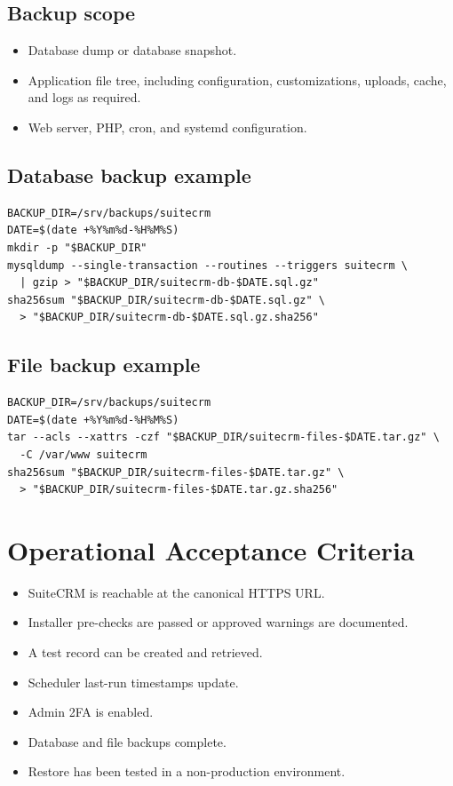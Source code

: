 \documentclass[11pt]{article}
\begin{document}
\subsection{Backup scope}
\begin{itemize}
  \item Database dump or database snapshot.
  \item Application file tree, including configuration, customizations, uploads, cache, and logs as required.
  \item Web server, PHP, cron, and systemd configuration.
\end{itemize}

\subsection{Database backup example}
\begin{verbatim}
BACKUP_DIR=/srv/backups/suitecrm
DATE=$(date +%Y%m%d-%H%M%S)
mkdir -p "$BACKUP_DIR"
mysqldump --single-transaction --routines --triggers suitecrm \
  | gzip > "$BACKUP_DIR/suitecrm-db-$DATE.sql.gz"
sha256sum "$BACKUP_DIR/suitecrm-db-$DATE.sql.gz" \
  > "$BACKUP_DIR/suitecrm-db-$DATE.sql.gz.sha256"
\end{verbatim}

\subsection{File backup example}
\begin{verbatim}
BACKUP_DIR=/srv/backups/suitecrm
DATE=$(date +%Y%m%d-%H%M%S)
tar --acls --xattrs -czf "$BACKUP_DIR/suitecrm-files-$DATE.tar.gz" \
  -C /var/www suitecrm
sha256sum "$BACKUP_DIR/suitecrm-files-$DATE.tar.gz" \
  > "$BACKUP_DIR/suitecrm-files-$DATE.tar.gz.sha256"
\end{verbatim}

\section{Operational Acceptance Criteria}
\begin{itemize}
  \item SuiteCRM is reachable at the canonical HTTPS URL.
  \item Installer pre-checks are passed or approved warnings are documented.
  \item A test record can be created and retrieved.
  \item Scheduler last-run timestamps update.
  \item Admin 2FA is enabled.
  \item Database and file backups complete.
  \item Restore has been tested in a non-production environment.
\end{itemize}
\end{document}
